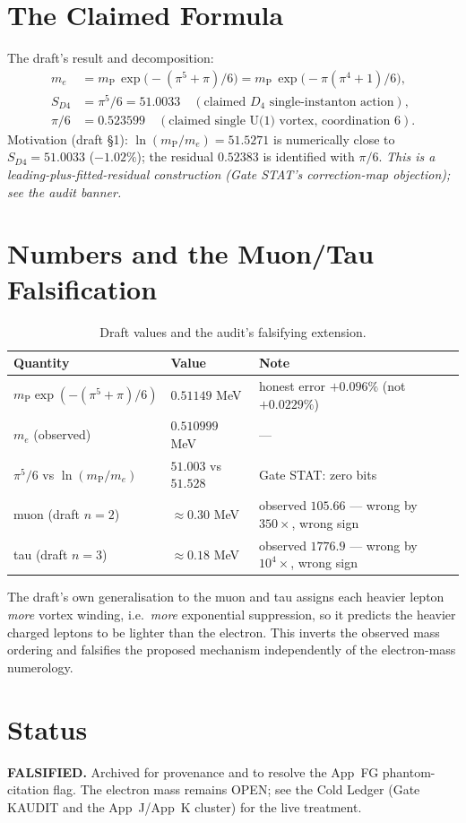\documentclass[aps,prl,preprint,superscriptaddress,floatfix]{revtex4-2}
\newcommand{\mP}{m_{\mathrm{P}}}
\newcommand{\me}{m_e}
\begin{document}
\section{The Claimed Formula}
The draft's result and decomposition:
\begin{align}
  \me &= \mP\,\exp\!\big(-(\pi^5+\pi)/6\big) = \mP\,\exp\!\big(-\pi(\pi^4+1)/6\big),\\
  S_{D4} &= \pi^5/6 = 51.0033 \quad(\text{claimed } D_4 \text{ single-instanton action}),\\
  \pi/6 &= 0.523599 \quad(\text{claimed single U(1) vortex, coordination 6}).
\end{align}
Motivation (draft \S1): $\ln(\mP/\me)=51.5271$ is numerically close to $S_{D4}=51.0033$
($-1.02\%$); the residual $0.52383$ is identified with $\pi/6$. \emph{This is a
leading-plus-fitted-residual construction (Gate STAT's correction-map objection); see the audit
banner.}

\section{Numbers and the Muon/Tau Falsification}
\begin{table}[h]
\centering
\caption{Draft values and the audit's falsifying extension.}
\begin{tabular}{lll}
\toprule
Quantity & Value & Note \\
\midrule
$\mP\exp(-(\pi^5+\pi)/6)$ & $0.51149$ MeV & honest error $+0.096\%$ (not $+0.0229\%$) \\
$\me$ (observed) & $0.510999$ MeV & --- \\
$\pi^5/6$ vs $\ln(\mP/\me)$ & $51.003$ vs $51.528$ & Gate STAT: zero bits \\
muon (draft $n=2$) & $\approx 0.30$ MeV & observed $105.66$ --- wrong by $350\times$, wrong sign \\
tau (draft $n=3$) & $\approx 0.18$ MeV & observed $1776.9$ --- wrong by $10^4\times$, wrong sign \\
\bottomrule
\end{tabular}
\end{table}

\noindent
The draft's own generalisation to the muon and tau assigns each heavier lepton \emph{more} vortex
winding, i.e.\ \emph{more} exponential suppression, so it predicts the heavier charged leptons to
be lighter than the electron. This inverts the observed mass ordering and falsifies the proposed
mechanism independently of the electron-mass numerology.

\section*{Status}
\textbf{FALSIFIED.} Archived for provenance and to resolve the App~FG phantom-citation flag. The
electron mass remains OPEN; see the Cold Ledger (Gate KAUDIT and the App~J/App~K cluster) for the
live treatment.
\end{document}
